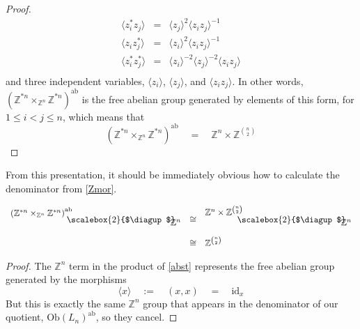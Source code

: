 \documentclass{amsbook} %
\newcommand{\bigquotient}[2]{ \raisebox{0.75\height}{$#1$} \mkern-12mu\scalebox{2}{$\diagup$}\mkern-10mu \raisebox{-0.5\height}{$#2$} }
\numberwithin{section}{chapter}
\begin{document}
\begin{proof}
\[\begin{array}{rll}
			\langle z_i^* z_j \rangle & = & \langle z_j \rangle^2 \langle z_i z_j \rangle^{-1} \\
			\langle z_i z_j^* \rangle & = & \langle z_i \rangle^2 \langle z_i z_j \rangle^{-1} \\
			\langle z_i^* z_j^* \rangle & = & \langle z_i \rangle^{-2} \langle z_j \rangle^{-2} \langle z_i z_j \rangle \\
		\end{array}
\]
and three independent variables, $\langle z_i \rangle$, $\langle z_j \rangle$, and $\langle z_i z_j \rangle$. In other words, $(\mathbb{Z}^{\ast n} \times_{\mathbb{Z}^n} \mathbb{Z}^{\ast n})^{\mathrm{ab}}$ is the free abelian group generated by elements of this form, for $1 \le i < j \le n$, which means that
\[ (\mathbb{Z}^{\ast n} \times_{\mathbb{Z}^n} \mathbb{Z}^{\ast n})^{\mathrm{ab}} \quad = \quad \mathbb{Z}^n \times \mathbb{Z}^{{n}\choose{2}} \]
\end{proof}

From this presentation, it should be immediately obvious how to calculate the denominator from \cref{Zmor}.

\begin{cor} \label{nchoose2}
\[ \begin{array}{rll}
			 \bigquotient{{(\mathbb{Z}^{\ast n} \times_{\mathbb{Z}^n} \mathbb{Z}^{\ast n})}^{\mathrm{ab}}}{\mathbb{Z}^n} & \cong & \bigquotient{\mathbb{Z}^n \times \mathbb{Z}^{{n}\choose{2}}}{\mathbb{Z}^n} \\[\bigskipamount]
			& \cong & \mathbb{Z}^{{n}\choose{2}} 
		\end{array}
\]
\end{cor}
\begin{proof}
The $\mathbb{Z}^n$ term in the product of \cref{abst} represents the free abelian group generated by the morphisms
\[ \langle x \rangle \quad := \quad (x,x) \quad = \quad \mathrm{id}_{x} \]
But this is exactly the same $\mathbb{Z}^n$ group that appears in the denominator of our quotient, $\mathrm{Ob}(L_n)^{\mathrm{ab}}$, so they cancel.
\end{proof}

\end{document}
